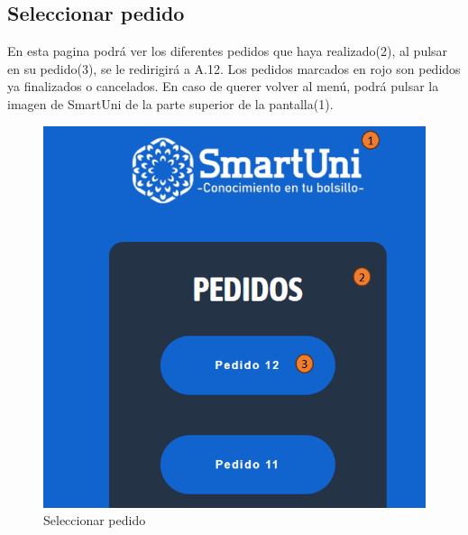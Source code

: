 \documentclass[12pt]{report}
\begin{document}
\begin{appendices}
\section{Seleccionar pedido}
En esta pagina podrá ver los diferentes pedidos que haya realizado(2), al pulsar en su pedido(3), se le redirigirá a A.12. Los pedidos marcados en rojo son pedidos ya finalizados o cancelados. En caso de querer volver al menú, podrá pulsar la imagen de SmartUni de la parte superior de la pantalla(1).\\
\begin{figure}[H]
    \centering
    \includegraphics[scale = 0.7]{imagenes//manual_de_usuario/12.png}
    \caption{Seleccionar pedido}
    \label{fig:enter-label}
\end{figure}
\newpage

\end{appendices}
\end{document}
